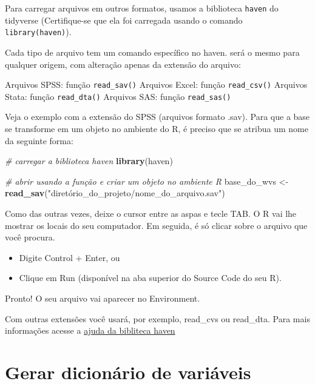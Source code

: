 \documentclass[
  brazil,
]{book}
\newenvironment{Shaded}{\begin{snugshade}}{\end{snugshade}}
\newcommand{\CommentTok}[1]{\textcolor[rgb]{0.56,0.35,0.01}{\textit{#1}}}
\newcommand{\KeywordTok}[1]{\textcolor[rgb]{0.13,0.29,0.53}{\textbf{#1}}}
\newcommand{\NormalTok}[1]{#1}
\newcommand{\StringTok}[1]{\textcolor[rgb]{0.31,0.60,0.02}{#1}}
\providecommand{\tightlist}{%
  \setlength{\itemsep}{0pt}\setlength{\parskip}{0pt}}
\begin{document}
Para carregar arquivos em outros formatos, usamos a biblioteca \texttt{haven} do tidyverse (Certifique-se que ela foi carregada usando o comando \texttt{library(haven)}).

Cada tipo de arquivo tem um comando específico no haven. será o mesmo para qualquer origem, com alteração apenas da extensão do arquivo:

Arquivos SPSS: função \texttt{read\_sav()}
Arquivos Excel: função \texttt{read\_csv()}
Arquivos Stata: função \texttt{read\_dta()}
Arquivos SAS: função \texttt{read\_sas()}

Veja o exemplo com a extensão do SPSS (arquivos formato .sav). Para que a base se transforme em um objeto no ambiente do R, é preciso que se atribua um nome da seguinte forma:

\begin{Shaded}
\begin{Highlighting}[]
\CommentTok{# carregar a biblioteca haven}
\KeywordTok{library}\NormalTok{(haven)}

\CommentTok{# abrir usando a função e criar um objeto no ambiente R}
\NormalTok{base_do_wvs <-}\StringTok{ }\KeywordTok{read_sav}\NormalTok{(}\StringTok{"diretório_do_projeto/nome_do_arquivo.sav"}\NormalTok{)}
\end{Highlighting}
\end{Shaded}

Como das outras vezes, deixe o cursor entre as aspas e tecle TAB. O R vai lhe mostrar os locais do seu computador. Em seguida, é só clicar sobre o arquivo que você procura.

\begin{itemize}
\tightlist
\item
  Digite Control + Enter, ou
\item
  Clique em Run (disponível na aba superior do Source Code do seu R).
\end{itemize}

Pronto! O seu arquivo vai aparecer no Environment.

Com outras extensões você usará, por exemplo, read\_cvs ou read\_dta. Para mais informações acesse a \href{https://haven.tidyverse.org/}{ajuda da bibliteca haven}

\hypertarget{gerar-dicionuxe1rio-de-variuxe1veis}{%
\section{Gerar dicionário de variáveis}\label{gerar-dicionuxe1rio-de-variuxe1veis}}
\end{document}
